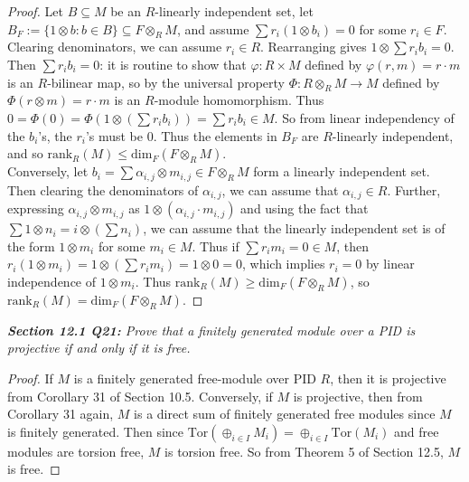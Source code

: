 \documentclass{article}
\begin{document}
  \begin{proof}
    Let $B\subseteq M$ be an $R$-linearly independent set, let
    $B_F:=\{1\otimes b:b\in B\} \subseteq F\otimes_RM$, and assume $\sum
    r_i(1\otimes b_i)=0$ for some $r_i\in F$. Clearing denominators, we can
    assume $r_i\in R$. Rearranging gives $1\otimes\sum r_ib_i=0$. Then
    $\sum r_ib_i=0$: it is routine to show that $\varphi:R\times M$ defined
    by $\varphi(r,m)=r\cdot m$ is an $R$-bilinear map, so by the universal
    property $\Phi:R\otimes_RM\rightarrow M$ defined by $\Phi(r\otimes
    m)=r\cdot m$ is an $R$-module homomorphism. Thus $0=\Phi(0)
    =\Phi(1\otimes(\sum r_ib_i)) =\sum r_ib_i\in M$. So from linear
    independency of the $b_i$'s, the $r_i$'s must be 0. Thus the elements
    in $B_F$ are $R$-linearly independent, and so
    $\text{rank}_R(M)\leq\text{dim}_F(F\otimes_RM)$. \\

    Conversely, let $b_i=\sum \alpha_{i,j}\otimes m_{i,j}\in F\otimes_RM$
    form a linearly independent set. Then clearing the denominators of
    $\alpha_{i,j}$, we can assume that $\alpha_{i,j}\in R$.  Further,
    expressing $\alpha_{i,j}\otimes m_{i,j}$ as $1\otimes(\alpha_{i,j}\cdot
    m_{i,j})$ and using the fact that $\sum 1\otimes n_i=i\otimes(\sum
    n_i)$, we can assume that the linearly independent set is of the form
    $1\otimes m_i$ for some $m_i\in M$. Thus if $\sum r_im_i=0\in M$, then
    $r_i(1\otimes m_i)=1\otimes(\sum r_im_i)=1\otimes0=0$, which implies
    $r_i=0$ by linear independence of $1\otimes m_i$. Thus
    $\text{rank}_R(M)\geq\text{dim}_F(F\otimes_RM)$, so $\text{rank}_R(M)
    =\text{dim}_F(F\otimes_RM)$.
  \end{proof}

\it \textbf{Section 12.1 Q21:} Prove that a finitely generated module over
  a PID is projective if and only if it is free.

  \begin{proof}
    If $M$ is a finitely generated free-module over PID $R$, then it is
    projective from Corollary 31 of Section 10.5. Conversely, if $M$ is
    projective, then from Corollary 31 again, $M$ is a direct sum of
    finitely generated free modules since $M$ is finitely generated. Then
    since $\text{Tor}(\oplus_{i\in I}M_i) =\oplus_{i\in I}\text{Tor}(M_i)$
    and free modules are torsion free, $M$ is torsion free. So from Theorem
    5 of Section 12.5, $M$ is free.
  \end{proof}
\end{document}
